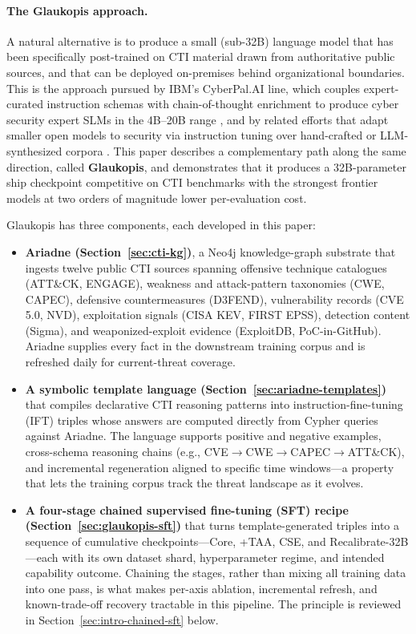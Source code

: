 \documentclass[unnumsec,webpdf,contemporary,large]{oup-authoring-template}
\theoremstyle{thmstyleone}
\theoremstyle{thmstyletwo}
\theoremstyle{thmstylethree}
\begin{document}
\paragraph{The Glaukopis approach.}
A natural alternative is to produce a small (sub-32B) language model that has been specifically post-trained on CTI material drawn from authoritative public sources, and that can be deployed on-premises behind organizational boundaries. This is the approach pursued by IBM's CyberPal.AI line, which couples expert-curated instruction schemas with chain-of-thought enrichment to produce cyber security expert SLMs in the 4B--20B range \cite{levi2024cyberpal,levi2025toward}, and by related efforts that adapt smaller open models to security via instruction tuning over hand-crafted or LLM-synthesized corpora \cite{ji2024sevenllm,liu2024cyberbench}. This paper describes a complementary path along the same direction, called \textbf{Glaukopis}, and demonstrates that it produces a 32B-parameter ship checkpoint competitive on CTI benchmarks with the strongest frontier models at two orders of magnitude lower per-evaluation cost.

Glaukopis has three components, each developed in this paper:

\begin{itemize}
  \item \textbf{Ariadne (Section~\ref{sec:cti-kg})}, a Neo4j knowledge-graph substrate that ingests twelve public CTI sources spanning offensive technique catalogues (ATT\&CK, ENGAGE), weakness and attack-pattern taxonomies (CWE, CAPEC), defensive countermeasures (D3FEND), vulnerability records (CVE 5.0, NVD), exploitation signals (CISA KEV, FIRST EPSS), detection content (Sigma), and weaponized-exploit evidence (ExploitDB, PoC-in-GitHub). Ariadne supplies every fact in the downstream training corpus and is refreshed daily for current-threat coverage.

  \item \textbf{A symbolic template language (Section~\ref{sec:ariadne-templates})} that compiles declarative CTI reasoning patterns into instruction-fine-tuning (IFT) triples whose answers are computed directly from Cypher queries against Ariadne. The language supports positive and negative examples, cross-schema reasoning chains (e.g., CVE$\to$CWE$\to$CAPEC$\to$ATT\&CK), and incremental regeneration aligned to specific time windows---a property that lets the training corpus track the threat landscape as it evolves.

  \item \textbf{A four-stage chained supervised fine-tuning (SFT) recipe (Section~\ref{sec:glaukopis-sft})} that turns template-generated triples into a sequence of cumulative checkpoints---Core, +TAA, CSE, and Recalibrate-32B---each with its own dataset shard, hyperparameter regime, and intended capability outcome. Chaining the stages, rather than mixing all training data into one pass, is what makes per-axis ablation, incremental refresh, and known-trade-off recovery tractable in this pipeline. The principle is reviewed in Section~\ref{sec:intro-chained-sft} below.
\end{itemize}
\end{document}
